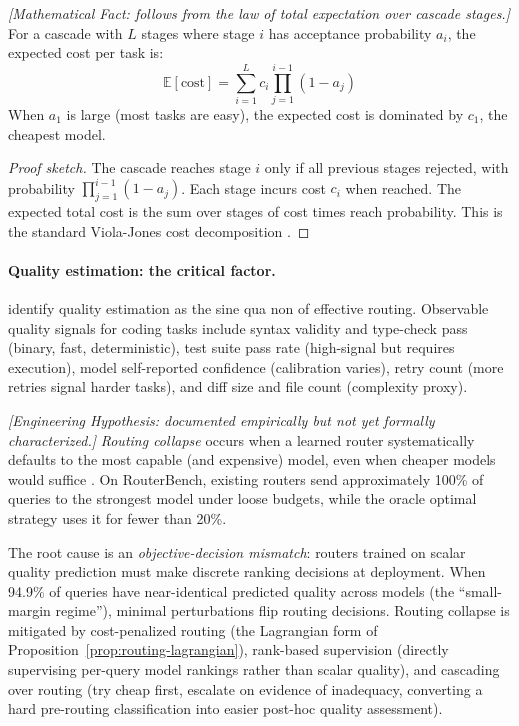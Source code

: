 \begin{theorem}
\emph{[Mathematical Fact: follows from the law of total expectation over cascade stages.]}
\label{thm:routing-cascadecost}
For a cascade with $L$ stages where stage $i$ has acceptance probability $a_i$, the expected cost per task is:
\begin{equation}
\mathbb{E}[\text{cost}] = \sum_{i=1}^{L} c_i \prod_{j=1}^{i-1}(1 - a_j)
\end{equation}
When $a_1$ is large (most tasks are easy), the expected cost is dominated by $c_1$, the cheapest model.
\end{theorem}

\begin{proof}[Proof sketch]
The cascade reaches stage $i$ only if all previous stages rejected, with probability $\prod_{j=1}^{i-1}(1 - a_j)$. Each stage incurs cost $c_i$ when reached. The expected total cost is the sum over stages of cost times reach probability. This is the standard Viola-Jones cost decomposition \citep{violajones2004}.
\end{proof}

\paragraph{Quality estimation: the critical factor.} \citet{dekoninck2025cascade} identify quality estimation as the sine qua non of effective routing. Observable quality signals for coding tasks include syntax validity and type-check pass (binary, fast, deterministic), test suite pass rate (high-signal but requires execution), model self-reported confidence (calibration varies), retry count (more retries signal harder tasks), and diff size and file count (complexity proxy).

\begin{definition}
\emph{[Engineering Hypothesis: documented empirically but not yet formally characterized.]}
\label{def:routing-collapse}
\emph{Routing collapse} occurs when a learned router systematically defaults to the most capable (and expensive) model, even when cheaper models would suffice \citep{routingcollapse2026}. On RouterBench, existing routers send approximately 100\% of queries to the strongest model under loose budgets, while the oracle optimal strategy uses it for fewer than 20\%.
\end{definition}

The root cause is an \emph{objective-decision mismatch}: routers trained on scalar quality prediction must make discrete ranking decisions at deployment. When 94.9\% of queries have near-identical predicted quality across models (the ``small-margin regime''), minimal perturbations flip routing decisions. Routing collapse is mitigated by cost-penalized routing (the Lagrangian form of Proposition~\ref{prop:routing-lagrangian}), rank-based supervision (directly supervising per-query model rankings rather than scalar quality), and cascading over routing (try cheap first, escalate on evidence of inadequacy, converting a hard pre-routing classification into easier post-hoc quality assessment).

